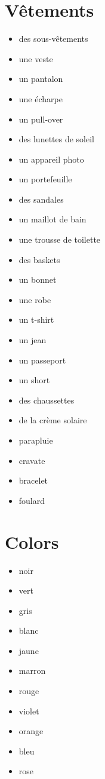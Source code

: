 \documentclass[palatino]{nicenotes}
\begin{document}
\section{V\^etements}

\begin{multicols}{3}
\begin{itemize}
\item des sous-v\^etements
\item une veste
\item un pantalon
\item une écharpe
\item un pull-over
\item des lunettes de soleil
\item un appareil photo
\item un portefeuille
\item des sandales
\item un maillot de bain
\item une trousse de toilette
\item des baskets
\item un bonnet
\item une robe
\item un t-shirt
\item un jean
\item un passeport
\item un short
\item des chaussettes
\item de la crème solaire
\item parapluie
\item cravate
\item bracelet
\item foulard
\end{itemize}
\end{multicols}

\section{Colors}

\begin{multicols}{3}
\begin{itemize}
\item noir
\item vert
\item gris
\item blanc
\item jaune
\item marron
\item rouge
\item violet
\item orange
\item bleu
\item rose
\end{itemize}
\end{multicols}
\end{document}
